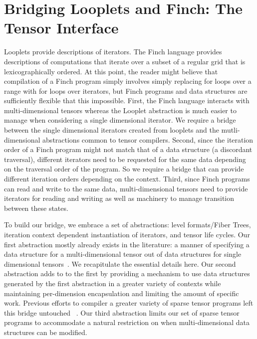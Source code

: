 \section{Bridging Looplets and Finch: The Tensor Interface}
Looplets provide descriptions of iterators. 
%
The Finch language provides descriptions of computations that iterate over a subset of a regular grid that is lexicographically ordered.
%
At this point, the reader might believe that compilation of a Finch program simply involves simply replacing for loops over a range with for loops over iterators, but Finch programs and data structures are sufficiently flexible that this impossible.
%
First, the Finch language interacts with multi-dimensional tensors whereas the Looplet abstraction is much easier to manage when considering a single dimensional iterator. 
%
We require a bridge between the single dimensional iterators created from looplets and the mutli-dimensional abstractions common to tensor compilers.
%
Second, since the iteration order of a Finch program might not match that of a data structure (a discordant traversal), different iterators need to be requested for the same data depending on the traversal order of the program.
%
So we require a bridge that can provide different iteration orders depending on the context.
%
Third, since Finch programs can read and write to the same data, multi-dimensional tensors need to provide iterators for reading and writing as well as machinery to manage transition between these states.

To build our bridge, we embrace a set of abstractions: level formats/Fiber Trees, iteration context dependent instantiation of iterators, and tensor life cycles.
%
Our first abstraction mostly already exists in the literature: a manner of specifying a data structure for a multi-dimensional tensor out of data structures for single dimensional tensors~\cite{sze2017efficient,chou2022compilation, chou2018format, sparseTIR}. 
%
We recapitulate the essential details here.
%
Our second abstraction adds to to the first by providing a mechanism to use data structures generated by the first abstraction in a greater variety of contexts while maintaining per-dimension encapsulation and limiting the amount of specific work.
%
Previous efforts to compiler a greater variety of sparse tensor programs left this bridge untouched ~\cite{henry2021compilation, won2023unified}.
%
Our third abstraction limits our set of sparse tensor programs to accommodate a natural restriction on when multi-dimensional data structures can be modified.
%

